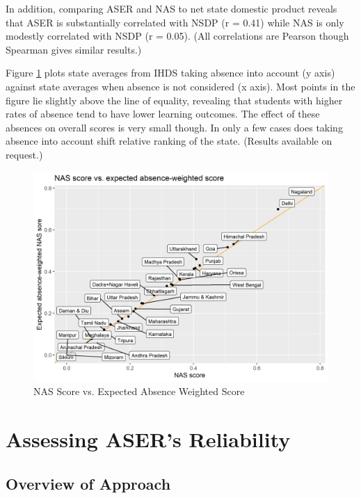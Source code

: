 \documentclass[
  11pt,
]{article}
\begin{document}
In addition, comparing ASER and NAS to net state domestic product reveals that ASER is substantially correlated with NSDP (r = 0.41) while NAS is only modestly correlated with NSDP (r = 0.05). (All correlations are Pearson though Spearman gives similar results.)

Figure \ref{fig:weighted} plots state averages from IHDS taking absence into account (y axis) against state averages when absence is not considered (x axis). Most points in the figure lie slightly above the line of equality, revealing that students with higher rates of absence tend to have lower learning outcomes. The effect of these absences on overall scores is very small though. In only a few cases does taking absence into account shift relative ranking of the state. (Results available on request.)

\begin{figure}

{\centering \includegraphics[width=0.8\linewidth]{absence_weighted_aser} 

}

\caption{NAS Score vs. Expected Absence Weighted Score}\label{fig:weighted}
\end{figure}

\hypertarget{assessing-asers-reliability}{%
\section{Assessing ASER's Reliability}\label{assessing-asers-reliability}}

\hypertarget{overview-of-approach}{%
\subsection{Overview of Approach}\label{overview-of-approach}}
\end{document}
